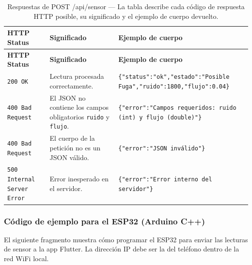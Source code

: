 \documentclass[12pt,a4paper]{article}
\begin{document}
\begin{longtable}{p{2.5cm} p{4cm} p{7cm}}
\caption{Respuestas de POST /api/sensor --- La tabla describe cada código de respuesta
  HTTP posible, su significado y el ejemplo de cuerpo devuelto.}
\label{tab:resp-post} \\
\toprule
\textbf{HTTP Status} & \textbf{Significado} & \textbf{Ejemplo de cuerpo} \\
\midrule
\endfirsthead
\toprule
\textbf{HTTP Status} & \textbf{Significado} & \textbf{Ejemplo de cuerpo} \\
\midrule
\endhead
\bottomrule
\endlastfoot
\texttt{200 OK} &
  Lectura procesada correctamente. &
  \texttt{\{"status":"ok","estado":"Posible Fuga","ruido":1800,"flujo":0.04\}} \\[0.5em]
\texttt{400 Bad Request} &
  El JSON no contiene los campos obligatorios \texttt{ruido} y \texttt{flujo}. &
  \texttt{\{"error":"Campos requeridos: ruido (int) y flujo (double)"\}} \\[0.5em]
\texttt{400 Bad Request} &
  El cuerpo de la petición no es un JSON válido. &
  \texttt{\{"error":"JSON inválido"\}} \\[0.5em]
\texttt{500 Internal Server Error} &
  Error inesperado en el servidor. &
  \texttt{\{"error":"Error interno del servidor"\}} \\
\end{longtable}

\subsubsection{Código de ejemplo para el ESP32 (Arduino C++)}

El siguiente fragmento muestra cómo programar el ESP32 para enviar las lecturas de
sensor a la app Flutter. La dirección IP debe ser la del teléfono dentro de la red
WiFi local.
\end{document}
